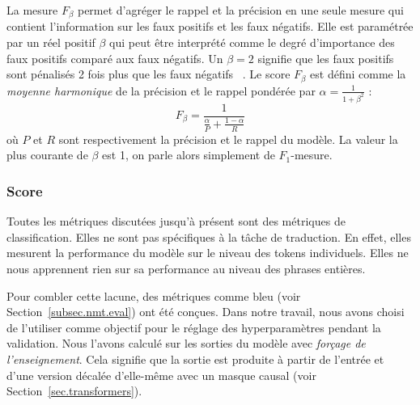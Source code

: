 La mesure \(F_\beta\) permet d'agréger le rappel et la précision en une seule mesure
qui contient l'information sur les faux positifs et les faux négatifs.
Elle est paramétrée par un réel positif \(\beta\) 
qui peut être interprété comme le degré d'importance des faux positifs comparé aux faux négatifs.
Un \(\beta = 2\) signifie que les faux positifs sont pénalisés 2 fois plus que les faux négatifs%
~\cite{books/bu/Rijsbergen79}.
Le score \(F_\beta\) est défini comme la \emph{moyenne harmonique} de la précision et le rappel
pondérée par \(\alpha = \frac{1}{1 + \beta^2}\) :
\begin{equation}
    \label{eq.fbeta}
    F_\beta = \frac{1}{\frac{\alpha}{P} + \frac{1 - \alpha}{R}}
\end{equation}
où \(P\) et \(R\) sont respectivement la précision et le rappel du modèle.
La valeur la plus courante de \(\beta\) est 1,
on parle alors simplement de \(F_1\)-mesure.


\subsubsection{Score }

Toutes les métriques discutées jusqu'à présent sont des métriques de classification.
Elles ne sont pas spécifiques à la tâche de traduction.
En effet, elles mesurent la performance du modèle sur le niveau des tokens individuels.
Elles ne nous apprennent rien sur sa performance au niveau des phrases entières.

Pour combler cette lacune, des métriques comme \gls{bleu} (voir Section~\ref{subsec.nmt.eval}) ont été conçues.
Dans notre travail, nous avons choisi de l'utiliser comme objectif 
pour le réglage des hyperparamètres pendant la validation.
Nous l'avons calculé sur les sorties du modèle avec \emph{forçage de l'enseignement}.
Cela signifie que la sortie est produite à partir de l'entrée et d'une version décalée 
d'elle-même avec un masque causal (voir Section~\ref{sec.transformers}).


